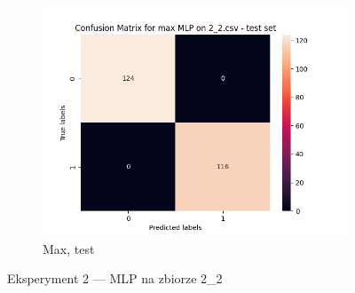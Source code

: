 \documentclass[12pt]{article}
\newcommand*{\subfigwidth}{0.24\textwidth}
\begin{document}
\begin{figure}[H]
\begin{subfigure}[t]{\subfigwidth}
        \includegraphics[width=\linewidth]{img/exp_2/mlp/2_2/max/test_matrix.png}
        \caption{Max, test}
    \end{subfigure} 
    
    \caption{Eksperyment 2 --- MLP na zbiorze 2\_2}\label{fig:figure12}
\end{figure}
\end{document}
